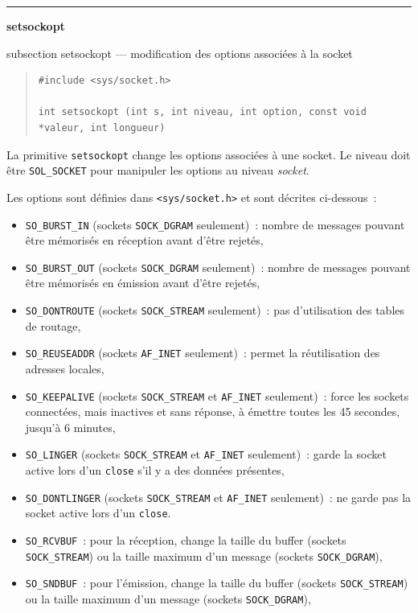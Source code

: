 \documentclass [twoside] {report}
\newcommand {\primitive} [1]
    {
	\phantomsection
	{\large \textbf {#1}}
	\addcontentsline {toc} {subsection} {#1}
    }
\newcommand {\separation}
    {
	\vspace {5mm}
	\nopagebreak
	\hrule
    }
\begin{document}
\separation
\primitive {setsockopt} --- modification des options associées à la socket

\begin {quote}
\begin {verbatim}
#include <sys/socket.h>

int setsockopt (int s, int niveau, int option, const void *valeur, int longueur)
\end{verbatim}
\end {quote}

La primitive \texttt {setsockopt} change les options associées à
une socket. Le niveau doit être \texttt {SOL\_SOCKET} pour
manipuler les options au niveau \emph {socket}.

Les options sont définies dans \texttt {<sys/socket.h>} et sont
décrites ci-dessous~:

\begin {itemize}
    \item \texttt {SO\_BURST\_IN} (sockets \texttt {SOCK\_DGRAM}
	seulement)~: nombre de messages pouvant être mémorisés
	en réception avant d'être rejetés,
    \item \texttt {SO\_BURST\_OUT} (sockets \texttt {SOCK\_DGRAM}
	seulement)~: nombre de messages pouvant être mémorisés
	en émission avant d'être rejetés,
    \item \texttt {SO\_DONTROUTE} (sockets \texttt {SOCK\_STREAM}
	seulement)~: pas d'utilisation des tables de
	routage,
    \item \texttt {SO\_REUSEADDR} (sockets \texttt {AF\_INET}
	seulement)~: permet la réutilisation des adresses
	locales,
    \item \texttt {SO\_KEEPALIVE} (sockets \texttt {SOCK\_STREAM} et
	\texttt {AF\_INET} seulement)~: force les sockets
	connectées, mais inactives et sans réponse, à
	émettre toutes les 45 secondes, jusqu'à 6 minutes,
    \item \texttt {SO\_LINGER} (sockets \texttt {SOCK\_STREAM} et
	\texttt {AF\_INET} seulement)~: garde la socket active
	lors d'un \texttt {close} s'il y a des données présentes,
    \item \texttt {SO\_DONTLINGER} (sockets \texttt {SOCK\_STREAM} et
	\texttt {AF\_INET} seulement)~: ne garde pas la socket active
	lors d'un \texttt {close}.
    \item \texttt {SO\_RCVBUF}~: pour la réception,
	change la taille du buffer
	(sockets \texttt {SOCK\_STREAM}) ou la taille
	maximum d'un message (sockets \texttt {SOCK\_DGRAM}),
    \item \texttt {SO\_SNDBUF}~: pour l'émission,
	change la taille du buffer
	(sockets \texttt {SOCK\_STREAM}) ou la taille
	maximum d'un message (sockets \texttt {SOCK\_DGRAM}),
\end {itemize}
\end{document}
